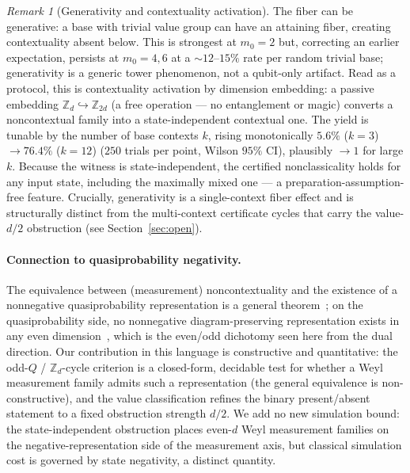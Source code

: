 \documentclass[11pt]{article}
\theoremstyle{remark}
\newtheorem{remark}[theorem]{Remark}
\newcommand{\Z}{\mathbb{Z}}
\begin{document}
\begin{remark}[Generativity and contextuality activation]\label{rem:activation}
The fiber can be generative: a base with trivial value group can have an attaining fiber, creating
contextuality absent below. This is strongest at $m_0=2$ but, correcting an earlier expectation,
persists at $m_0=4,6$ at a ${\sim}12\text{--}15\%$ rate per random trivial base; generativity is a
generic tower phenomenon, not a qubit-only artifact. Read as a protocol, this is contextuality
activation by dimension embedding: a passive embedding $\Z_d\hookrightarrow\Z_{2d}$ (a free operation
--- no entanglement or magic) converts a noncontextual family into a state-independent contextual one.
The yield is tunable by the number of base contexts $k$, rising monotonically $5.6\%$ ($k{=}3$)
$\to 76.4\%$ ($k{=}12$) ($250$ trials per point, Wilson $95\%$ CI), plausibly $\to 1$ for large $k$.
Because the witness is state-independent, the certified nonclassicality holds for any input state,
including the maximally mixed one --- a preparation-assumption-free feature. Crucially, generativity
is a single-context fiber effect and is structurally distinct from the multi-context certificate
cycles that carry the value-$d/2$ obstruction (see Section~\ref{sec:open}).
\end{remark}

\paragraph{Connection to quasiprobability negativity.} The equivalence between (measurement)
noncontextuality and the existence of a nonnegative quasiprobability representation is a general
theorem~\cite{Spekkens,Wallman}; on the quasiprobability side, no nonnegative diagram-preserving
representation exists in any even dimension~\cite{Wallman}, which is the even/odd dichotomy seen here
from the dual direction. Our contribution in this language is constructive and quantitative: the
odd-$Q$ / $\Z_d$-cycle criterion is a closed-form, decidable test for whether a Weyl measurement
family admits such a representation (the general equivalence is non-constructive), and the value
classification refines the binary present/absent statement to a fixed obstruction strength $d/2$. We
add no new simulation bound: the state-independent obstruction places even-$d$ Weyl measurement
families on the negative-representation side of the measurement axis, but classical simulation cost is
governed by state negativity, a distinct quantity.
\end{document}
